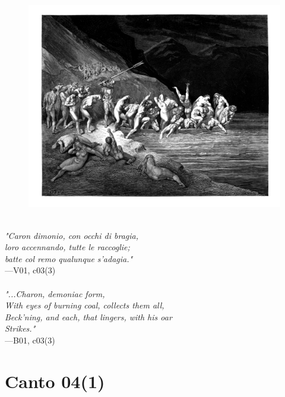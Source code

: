 \documentclass[../Dore_vision.tex]{subfiles}
\begin{document}
\begin{figure}[ht]
\centering
\includegraphics[height=\figsize]{illustrations/book_1/V01, c03(3).jpg}
\end{figure}

\begin{center}
\begin{minipage}{0.8\linewidth}
\textit{\\
"Caron dimonio, con occhi di bragia,\\loro accennando, tutte le raccoglie;\\batte col remo qualunque s’adagia."} \\
—V01, c03(3) \\~\\
\textit{"...Charon, demoniac form,\\With eyes of burning coal, collects them all,\\Beck'ning, and each, that lingers, with his oar\\Strikes."} \\
—B01, c03(3)
\end{minipage}
\end{center}

\newpage

\section{Canto 04(1)}
\end{document}
